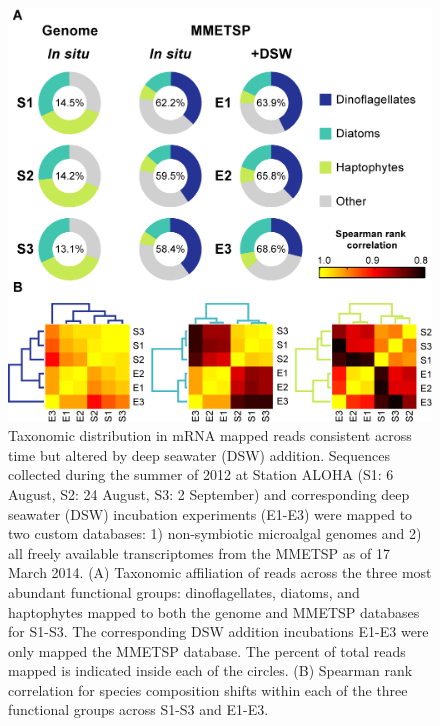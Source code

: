 \begin{figure}[p!]
  \centering
    \includegraphics[width=.8\textwidth]{Images/C4_Figure1_Final.png}
    \caption[Taxonomic distribution in mRNA mapped reads consistent across time but altered by deep seawater (DSW) addition]{Taxonomic distribution in mRNA mapped reads consistent across time but altered by deep seawater (DSW) addition. Sequences collected during the summer of 2012 at Station ALOHA (S1: 6 August, S2: 24 August, S3: 2 September) and corresponding deep seawater (DSW) incubation experiments (E1-E3) were mapped to two custom databases: 1) non-symbiotic microalgal genomes and 2) all freely available transcriptomes from the MMETSP as of 17 March 2014. (A) Taxonomic affiliation of reads across the three most abundant functional groups: dinoflagellates, diatoms, and haptophytes mapped to both the genome and MMETSP databases for S1-S3. The corresponding DSW addition incubations E1-E3 were only mapped the MMETSP database. The percent of total reads mapped is indicated inside each of the circles. (B) Spearman rank correlation for species composition shifts within each of the three functional groups across S1-S3 and E1-E3.}
  \label{fig:c4f1}
\end{figure}

